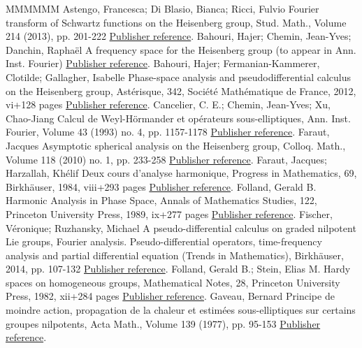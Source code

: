 \documentclass[11pt]{article}
\theoremstyle{definition}
\numberwithin{equation}{section}
\numberwithin{figure}{section}
\numberwithin{table}{section}
\begin{document}
\begin{thebibliography}{MMMMMM}
 Astengo, Francesca; Di Blasio, Bianca; Ricci, Fulvio Fourier transform of Schwartz functions on the Heisenberg group, Stud. Math., Volume 214 (2013), pp. 201-222 \href{https://ahl.centre-mersenne.org/item/AHL_2018__1__1_0/#astengo2}{Publisher reference}.
 Bahouri, Hajer; Chemin, Jean-Yves; Danchin, Raphaël A frequency space for the Heisenberg group (to appear in Ann. Inst. Fourier) \href{https://ahl.centre-mersenne.org/item/AHL_2018__1__1_0/#bcdFHspace}{Publisher reference}.
 Bahouri, Hajer; Fermanian-Kammerer, Clotilde; Gallagher, Isabelle Phase-space analysis and pseudodifferential calculus on the Heisenberg group, Astérisque, 342, Société Mathématique de France, 2012, vi+128 pages \href{https://ahl.centre-mersenne.org/item/AHL_2018__1__1_0/#bfg}{Publisher reference}.
 Cancelier, C. E.; Chemin, Jean-Yves; Xu, Chao-Jiang Calcul de Weyl-Hörmander et opérateurs sous-elliptiques, Ann. Inst. Fourier, Volume 43 (1993) no. 4, pp. 1157-1178 \href{https://ahl.centre-mersenne.org/item/AHL_2018__1__1_0/#CCX}{Publisher reference}.
 Faraut, Jacques Asymptotic spherical analysis on the Heisenberg group, Colloq. Math., Volume 118 (2010) no. 1, pp. 233-258 \href{https://ahl.centre-mersenne.org/item/AHL_2018__1__1_0/#F}{Publisher reference}.
 Faraut, Jacques; Harzallah, Khélif Deux cours d’analyse harmonique, Progress in Mathematics, 69, Birkhäuser, 1984, viii+293 pages \href{https://ahl.centre-mersenne.org/item/AHL_2018__1__1_0/#farautharzallah}{Publisher reference}.
 Folland, Gerald B. Harmonic Analysis in Phase Space, Annals of Mathematics Studies, 122, Princeton University Press, 1989, ix+277 pages \href{https://ahl.centre-mersenne.org/item/AHL_2018__1__1_0/#folland}{Publisher reference}.
 Fischer, Véronique; Ruzhansky, Michael A pseudo-differential calculus on graded nilpotent Lie groups, Fourier analysis. Pseudo-differential operators, time-frequency analysis and partial differential equation (Trends in Mathematics), Birkhäuser, 2014, pp. 107-132 \href{https://ahl.centre-mersenne.org/item/AHL_2018__1__1_0/#fisher}{Publisher reference}.
 Folland, Gerald B.; Stein, Elias M. Hardy spaces on homogeneous groups, Mathematical Notes, 28, Princeton University Press, 1982, xii+284 pages \href{https://ahl.centre-mersenne.org/item/AHL_2018__1__1_0/#follandstein}{Publisher reference}.
 Gaveau, Bernard Principe de moindre action, propagation de la chaleur et estimées sous-elliptiques sur certains groupes nilpotents, Acta Math., Volume 139 (1977), pp. 95-153 \href{https://ahl.centre-mersenne.org/item/AHL_2018__1__1_0/#gaveau}{Publisher reference}.

\end{thebibliography}
\end{document}
